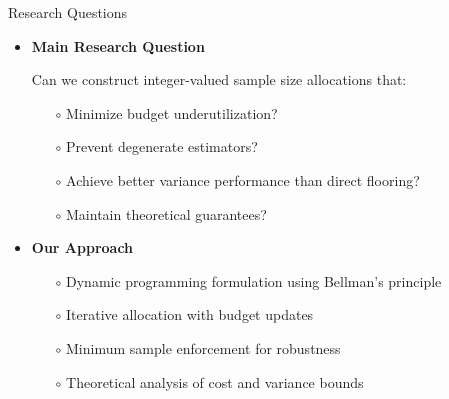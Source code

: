\documentclass{beamer}
\begin{document}
\begin{frame}{Research Questions}
\begin{itemize}[leftmargin=5pt] 
\item \textcolor{myred}{\bf Main Research Question}

Can we construct integer-valued sample size allocations that:
\begin{itemize}[leftmargin=15pt] 
\item[$\circ$] Minimize budget underutilization?
\item[$\circ$] Prevent degenerate estimators?
\item[$\circ$] Achieve better variance performance than direct flooring?
\item[$\circ$] Maintain theoretical guarantees?
\end{itemize}

\vspace{1em}
\item \textcolor{myblue3}{\bf Our Approach}
\begin{itemize}[leftmargin=15pt] 
\item[$\circ$] Dynamic programming formulation using Bellman's principle
\item[$\circ$] Iterative allocation with budget updates
\item[$\circ$] Minimum sample enforcement for robustness
\item[$\circ$] Theoretical analysis of cost and variance bounds
\end{itemize}
\end{itemize}
\end{frame}
\end{document}
